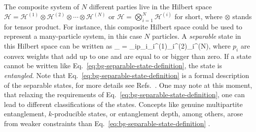 The composite system of $N$ different parties live in the Hilbert space $\mathcal{H} = \mathcal{H}^{(1)}\otimes\mathcal{H}^{(2)}\otimes\cdots\otimes\mathcal{H}^{(N)}$ or $\mathcal{H} = \bigotimes_{i=1}^N\mathcal{H}^{(i)}$ for short, where $\otimes$ stands for tensor product.
For instance, this composite Hilbert space could be used to represent a many-particle system, in this case $N$ particles.
A \emph{separable} state in this Hilbert space can be written as
\be
  \rho_{} = \sum_{i}p_i\rho_i^{(1)}\otimes\rho_i^{(2)}\otimes\cdots\otimes\rho_i^{(N)},
  \label{eq:bg-separable-state-definition}
\ee
where $p_i$ are convex weights that add up to one and are equal to or bigger than zero.
If a state cannot be written like Eq.~\eqref{eq:bg-separable-state-definition}, the state is \emph{entangled}.
Note that Eq.~\eqref{eq:bg-separable-state-definition} is a formal description of the separable states, for more details see Refs.~\cite{Guehne2009, Luis2004}.
One may note at this moment, that relaxing the requirements of Eq.~\eqref{eq:bg-separable-state-definition}, one can lead to different classifications of the states.
Concepts like genuine multipartite entanglement, $k$-producible states, or entanglement depth, among others, arose from weaker constraints than Eq.~\eqref{eq:bg-separable-state-definition} \cite{Guehne2009, Luis2004}.

